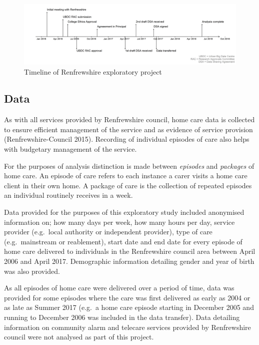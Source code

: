 \documentclass[]{article}
\begin{document}
\begin{figure}[h]
  \centering
    \includegraphics{figures/chapter-renf/renf-timeline.png}
    \caption{Timeline of Renfrewshire exploratory project}
    \label{fig:ren-timeline}
\end{figure}

\subsection{Data}\label{subsec:renf-methods-data}

As with all services provided by Renfrewshire council, home care data is
collected to ensure efficient management of the service and as evidence
of service provision (Renfrewshire-Council 2015). Recording of
individual episodes of care also helps with budgetary management of the
service.

For the purposes of analysis distinction is made between \emph{episodes}
and \emph{packages} of home care. An episode of care refers to each
instance a carer visits a home care client in their own home. A package
of care is the collection of repeated episodes an individual routinely
receives in a week.

Data provided for the purposes of this exploratory study included
anonymised information on; how many days per week, how many hours per
day, service provider (e.g.~local authority or independent provider),
type of care (e.g.~mainstream or reablement), start date and end date
for every episode of home care delivered to individuals in the
Renfrewshire council area between April 2006 and April 2017. Demographic
information detailing gender and year of birth was also provided.

As all episodes of home care were delivered over a period of time, data
was provided for some episodes where the care was first delivered as
early as 2004 or as late as Summer 2017 (e.g.~a home care episode
starting in December 2005 and running to December 2006 was included in
the data transfer). Data detailing information on community alarm and
telecare services provided by Renfrewshire council were not analysed as
part of this project.
\end{document}
